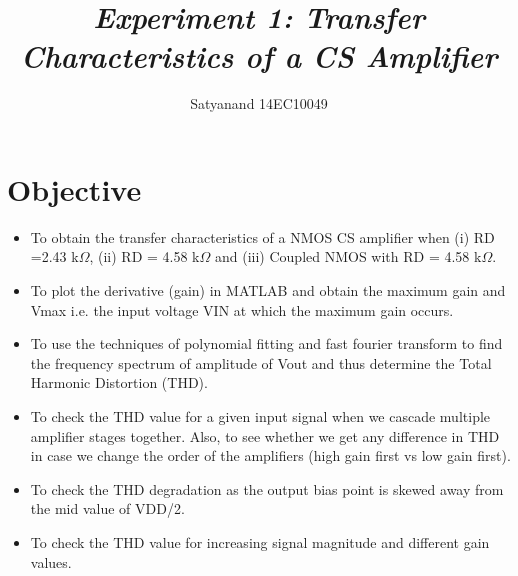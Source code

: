 \documentclass[12pt]{article}
\title{{\it \textbf{Experiment 1:\hspace{0.5cm} Transfer Characteristics of a CS Amplifier}\/} }
\author
{Satyanand 14EC10049\\
\normalize{Rohit Kumar 14EC10043}
}
\renewcommand{\baselinestretch}{0.5}
\begin{document}
 


\baselineskip14pt


\maketitle 








\renewcommand{\baselinestretch}{0.5} 

\section*{Objective}
\begin{itemize}
\item To obtain the transfer characteristics of a NMOS CS amplifier when (i) RD =2.43 k$\Omega$, (ii) RD = 4.58 k$\Omega$ and (iii) Coupled NMOS with RD = 4.58 k$\Omega$.
\item To plot the derivative (gain) in MATLAB and obtain the maximum gain and Vmax i.e. the input voltage VIN at which the maximum gain occurs.
\item To use the techniques of polynomial fitting and fast fourier transform to find the frequency spectrum of amplitude of Vout and thus determine the Total Harmonic Distortion (THD).
\item To check the THD value for a given input signal when we cascade multiple amplifier stages together. Also, to see whether we get any difference in THD in case we change the order of the amplifiers (high gain first vs low gain first).
\item To check the THD degradation as the output bias point is skewed away from the mid value of VDD/2.
\item To check the THD value for increasing signal magnitude and different gain values.
\end{itemize}
\end{document}
